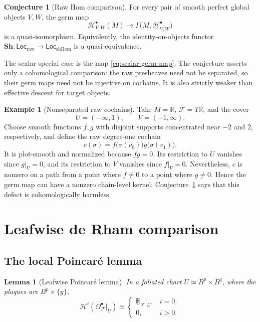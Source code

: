 \documentclass[12pt]{amsart}
\newtheorem{lem}[thm]{Lemma}
\theoremstyle{definition}
\newtheorem{example}[thm]{Example}
\newtheorem{conj}[thm]{Conjecture}
\theoremstyle{remark}
\numberwithin{equation}{section}
\newcommand{\CF}{{\mathcal F}}
\newcommand{\R}{{\mathbb{R}}}
\newcommand{\1}{{\mathbb{1}}}
\newcommand{\Loc}{\mathsf{Loc}}
\begin{document}
\begin{conj}[Raw Hom comparison]\label{conj:raw-hom}
For every pair of smooth perfect global objects $V,W$, the germ map
\[
 \mathcal H^\bullet_{V,W}(M)
 \longrightarrow
 \Gamma\bigl(M,\underline{\mathcal H}^\bullet_{V,W}\bigr)
\]
is a quasi-isomorphism.  Equivalently, the identity-on-objects functor
$\mathbf{Sh}:\Loc_{\mathrm{raw}}\to\Loc_{\mathrm{shHom}}$ is a
quasi-equivalence.
\end{conj}

The scalar special case is the map
\eqref{eq:scalar-germ-map}.  The conjecture asserts only a
cohomological comparison: the raw presheaves need not be separated,
so their germ maps need not be injective on cochains.  It is also
strictly weaker than effective descent for target objects.

\begin{example}[Nonseparated raw cochains]\label{ex:nonseparated}
Take $M=\R$, $\CF=T\R$, and the cover
\[
 U=(-\infty,1),\qquad V=(-1,\infty).
\]
Choose smooth functions $f,g$ with disjoint supports concentrated near
$-2$ and $2$, respectively, and define the raw degree-one cochain
\[
 c(\sigma)=f\bigl(\sigma(v_0)\bigr)g\bigl(\sigma(v_1)\bigr).
\]
It is plot-smooth and normalized because $fg=0$.  Its restriction to
$U$ vanishes since $g|_U=0$, and its restriction to $V$ vanishes since
$f|_V=0$.  Nevertheless, $c$ is nonzero on a path from a point where
$f\neq0$ to a point where $g\neq0$.  Hence the germ map can have a
nonzero chain-level kernel; Conjecture~\ref{conj:raw-hom} says that
this defect is cohomologically harmless.
\end{example}

\section{Leafwise de Rham comparison}

\subsection{The local Poincar\'e lemma}

\begin{lem}[Leafwise Poincar\'e lemma]\label{lem:leafwise-poincare}
In a foliated chart
$U\simeq B^p\times B^q$, where the plaques are
$B^p\times\{y\}$,
\[
 \mathcal H^i(\Omega^\bullet_{\CF}|_U)
 \simeq
 \begin{cases}
 \underline{\R}_{\CF}|_U,&i=0,\\
 0,&i>0.
 \end{cases}
\]
\end{lem}
\end{document}

